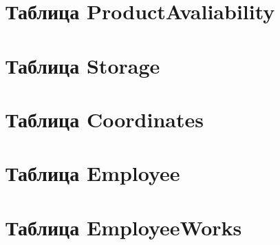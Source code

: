 \documentclass[14pt,a4paper,report]{report}
\begin{document}
\part{Таблица ProductAvaliability}


\part{Таблица Storage}



\part{Таблица Coordinates}



\part{Таблица Employee}



\part{Таблица EmployeeWorks}
\end{document}

